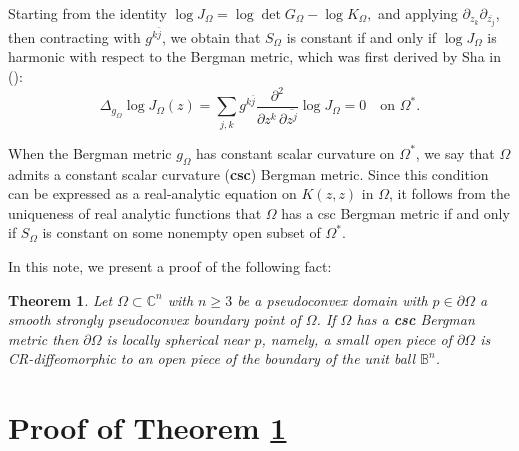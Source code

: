 \documentclass[a4paper,centertags,osxzneside,12pt]{amsart}
\newtheorem{theorem}{Theorem}[section]
\numberwithin{equation}{section}
\begin{document}
Starting from the identity
$ 
\log J_\Omega = \log \det G_\Omega - \log K_\Omega,
$ 
and applying \( \partial_{z_k} \partial_{\overline{z_j}} \), then contracting with \( g^{k\bar{j}} \), we obtain that \( S_{\Omega} \) is constant if and only if \( \log J_\Omega \) is harmonic with respect to the Bergman metric, which was first derived by Sha in  (\cite{S26}):
\[
\Delta_{g_\Omega} \log J_\Omega (z)
=
\sum_{j,k} g^{k\bar{j}}
\frac{\partial^2}{\partial z^k \,\partial \overline{z^j}} \log J_\Omega=0
\quad \text{on } \Omega^*.
\]

When the Bergman metric \( g_\Omega \) has constant scalar curvature on \( \Omega^* \), we say that \( \Omega \) admits a constant scalar curvature ({\bf csc}) Bergman metric.
Since this condition can be expressed as a real-analytic equation on $K(z,z)$ in \( \Omega \), it follows from the uniqueness of real analytic functions  that \( \Omega \) has a csc Bergman metric if and only if \( S_\Omega \) is constant on some nonempty open subset of \( \Omega^* \).

In this note, we present a   proof of the following fact:
\begin{theorem} \label{main}
Let $\Omega
\subset {\mathbb C}^n$ with $n\ge 3$ be a pseudoconvex domain with $p\in \partial\Omega$ a  smooth strongly pseudoconvex  boundary point of $\Omega$. If $\Omega$  has  a {\bf csc} Bergman metric then $\partial\Omega$ is locally spherical near $p$, namely, a small open piece of 
$\partial\Omega$ is CR-diffeomorphic to an open piece of the boundary of the unit ball $\mathbb{B}^n$. 
\end{theorem}

\section{Proof of Theorem \ref{main}}
\end{document}
